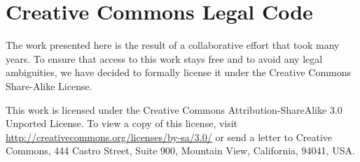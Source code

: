 \section{Creative Commons Legal Code}
\label{sec:cc}        

The work presented here is the result of a collaborative effort
that took many years.  To ensure that access to this work stays free
and to avoid any legal ambiguities, we have decided to formally license
it under the Creative Commons Share-Alike License.

This work is licensed under the Creative Commons Attribution-ShareAlike 3.0 Unported License. To view a copy of this license, visit \url{http://creativecommons.org/licenses/by-sa/3.0/} or send a letter to Creative Commons, 444 Castro Street, Suite 900, Mountain View, California, 94041, USA.

